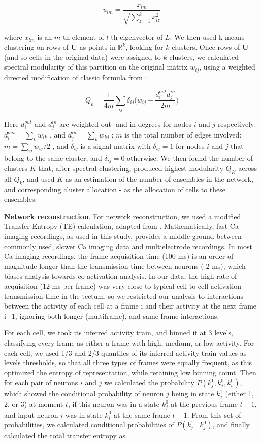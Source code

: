 \documentclass{article}
\begin{document}
\[ u_{lm} = \frac{x_{lm}}{\sqrt{\sum_{z=1}^{k}{x_{lz}^2}}} \]

where $x_{lm}$ is an $m$-th element of $l$-th eigenvector of $L$. We then used k-means clustering on rows of $\textbf{U}$ as points in $\mathbb{R}^k$, looking for $k$ clusters. Once rows of $\textbf{U}$ (and so cells in the original data) were assigned to $k$ clusters, we calculated spectral modularity of this partition on the original matrix $w_{ij}$, using a weighted directed modification of classic formula from \citep{newman2006modularity}:

\[ Q_k = \frac{1}{4m}\sum_{ij}{\delta_{ij}\Big(w_{ij}-\frac{d^{out}_i d^{in}_j}{2m}}\Big) \]

Here $d^{out}_i$ and $d^{in}_j$ are weighted out- and in-degrees for nodes $i$ and $j$ respectively: $d^{out}_i = \sum_k{w_{ik}}$ , and $d^{in}_j = \sum_k{w_{kj}}$ ; $m$ is the total number of edges involved: $m = \sum_{ij}{w_{ij}}/2$ , and $\delta_{ij}$ is a signal matrix with $\delta_{ij}=1$ for nodes $i$ and $j$ that belong to the same cluster, and $\delta_{ij} = 0$ otherwise. We then found the number of clusters $K$ that, after spectral clustering, produced highest modularity $Q_K$ across all $Q_k$, and used $K$ as an estimation of the number of ensembles in the network, and corresponding cluster allocation - as the allocation of cells to these ensembles.

\textbf{Network reconstruction}. For network reconstruction, we used a modified Transfer Entropy (TE) calculation, adapted from \citep{stetter2012te,gourevitch2007te}. Mathematically, fast Ca imaging recordings, as used in this study, provides a middle ground between commonly used, slower Ca imaging data and multielectrode recordings. In most Ca imaging recordings, the frame acquisition time (100 ms) is an order of magnitude longer than the transmission time between neurons ( 2 ms), which biases analysis towards co-activation analysis. In our data, the high rate of acquisition (12 ms per frame) was very close to typical cell-to-cell activation transmission time in the tectum, so we restricted our analysis to interactions between the activity of each cell at a frame i and their activity at the next frame i+1, ignoring both longer (multiframe), and same-frame interactions.

For each cell, we took its inferred activity train, and binned it at 3 levels, classifying every frame as either a frame with high, medium, or low activity. For each cell, we used 1/3 and 2/3 quantiles of its inferred activity train values as levels thresholds, so that all three types of frames were equally frequent, as this optimized the entropy of representation, while retaining low binning count. Then for each pair of neurons $i$ and $j$ we calculated the probability $P(k_j^1,k_j^0,k_i^0)$, which showed the conditional probability of neuron $j$ being in state $k_j^1$ (either 1, 2, or 3) at moment $t$, if this neuron was in a state $k_j^0$ at the previous frame $t-1$, and  input neuron $i$ was in state $k_i^0$ at the same frame $t-1$. From this set of probabilities, we calculated conditional probabilities of $P(k_j^1 \mid k_j^0)$, and finally calculated the total transfer entropy as
\end{document}
